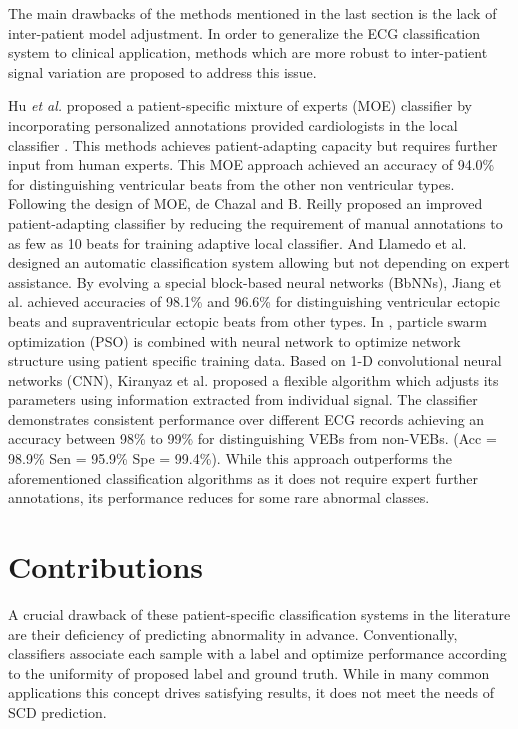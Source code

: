 The main drawbacks of the methods mentioned in the last section is the lack of inter-patient model adjustment. In order to generalize the ECG classification system to clinical application, methods which are more robust to inter-patient signal variation are proposed to address this issue\cite{Hu_et_al,deChazal2006,llamedo2012automatic,bbnn,ince2009generic,Kiranyaz}.

Hu \textit{et al.} proposed a patient-specific mixture of experts (MOE) classifier by incorporating personalized annotations provided cardiologists in the local classifier \cite{Hu_et_al}. This methods achieves patient-adapting capacity but requires further input from human experts. This MOE approach achieved an accuracy of 94.0\% for distinguishing ventricular beats from the other non ventricular types. Following the design of MOE, de Chazal and B. Reilly proposed an improved patient-adapting classifier by reducing the requirement of manual annotations to as few as 10 beats for training adaptive local classifier\cite{deChazal2006}. And Llamedo et al. designed an automatic classification system allowing but not depending on expert assistance\cite{llamedo2012automatic}. By evolving a special block-based neural networks (BbNNs), Jiang et al. achieved accuracies of 98.1\% and 96.6\% for distinguishing ventricular ectopic beats and supraventricular ectopic beats from other types\cite{bbnn}. In \cite{ince2009generic}, particle swarm optimization (PSO) is combined with neural network to optimize network structure using patient specific training data. Based on 1-D convolutional neural networks (CNN), Kiranyaz et al. proposed a flexible algorithm which adjusts its parameters using information extracted from individual signal\cite{Kiranyaz}. The classifier demonstrates consistent performance over different ECG records achieving an accuracy between 98\% to 99\% for distinguishing VEBs from non-VEBs. (Acc = 98.9\%  Sen = 95.9\% Spe =  99.4\%). While this approach outperforms the aforementioned classification algorithms as it does not require expert further annotations, its performance reduces for some rare abnormal classes. 
 
\section{Contributions}

A crucial drawback of these patient-specific classification systems in the literature are their deficiency of predicting abnormality in advance. Conventionally, classifiers associate each sample with a label and optimize performance according to the uniformity of proposed label and ground truth. While in many common applications this concept drives satisfying results, it does not meet the needs of SCD prediction. %

